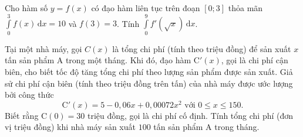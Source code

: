 \begin{bt}%
	Cho hàm số $ y=f(x) $ có đạo hàm liên tục trên đoạn $ [0;3] $ thỏa mãn $ \displaystyle \int \limits_0^3 f(x)\mathrm{\,d}x=10$ và $ f(3)=3 $. Tính $ \displaystyle \int \limits_0^9 f'\left(\sqrt{x}\right)\mathrm{\,d}x$.
\end{bt}

\begin{bt}%
	Tại một nhà máy, gọi $C(x)$ là tổng chi phí (tính theo triệu đồng) để sản xuất $x$ tấn sản phẩm $\mathrm{A}$ trong một tháng. Khi đó, đạo hàm $\mathrm{C}'(x)$, gọi là chi phí cận biên, cho biết tốc độ tăng tổng chi phí theo lượng sản phẩm được sản xuất. Giả sử chi phí cận biên (tính theo triệu đồng trên tấn) của nhà máy được ước lượng bởi công thức
	$$
	\mathrm{C}'(x)=5-0{,}06 x+0{,}00072 x^2 \text{ với } 0 \leq x \leq 150.
	$$
	Biết rằng $\mathrm{C}(0)=30$ triệu đồng, gọi là chi phí cố định. Tính tổng chi phí (đơn vị triệu đồng) khi nhà máy sản xuất $100$ tấn sản phẩm A trong tháng.
\end{bt}

